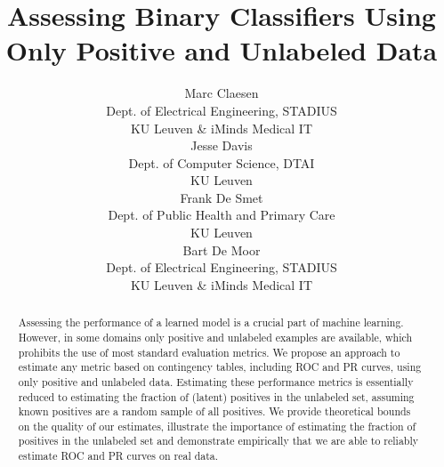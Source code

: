 \documentclass{article} %
\title{Assessing Binary Classifiers Using Only Positive and Unlabeled Data}
\author{
Marc Claesen \\
Dept. of Electrical Engineering, STADIUS \\
KU Leuven \& iMinds Medical IT\\
\mailto{marc.claesen@esat.kuleuven.be} 
\And
Jesse Davis \\
Dept. of Computer Science, DTAI \\
KU Leuven \\
\mailto{jesse.davis@cs.kuleuven.be} 
\And
Frank De Smet \\
Dept. of Public Health and Primary Care \\
KU Leuven \\
\And
Bart De Moor \\
Dept. of Electrical Engineering, STADIUS \\
KU Leuven \& iMinds Medical IT \\
}
\begin{document}
\maketitle

\begin{abstract}
Assessing the performance of a learned model is a crucial part of machine learning. However, in some domains only positive and unlabeled examples are available, which prohibits the use of most standard evaluation metrics. We propose an approach to estimate any metric based on contingency tables, including ROC and PR curves, using only positive and unlabeled data. Estimating these performance metrics is essentially reduced to estimating the fraction of (latent) positives in the unlabeled set, assuming known positives are a random sample of all positives. We provide theoretical bounds on the quality of our estimates, illustrate the importance of estimating the fraction of positives in the unlabeled set and demonstrate empirically that we are able to reliably estimate ROC and PR curves on real data. %
\end{abstract}







%
%

\end{document}

